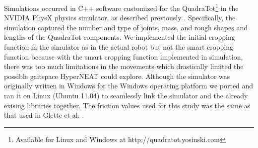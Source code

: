 Simulations occurred in C++ software customized for the QuadraTot\footnote{Available for Linux and Windows at http://quadratot.yosinski.com} in the NVIDIA PhysX physics simulator, as described previously \cite{glette}. 
Specifically, the simulation captured the number and type of joints, mass, and rough shapes and lengths of the QuadraTot components. 
We implemented the initial cropping function in the simulator as in the actual robot but not the smart cropping function because with the smart cropping function implemented in simulation, there was too much limitations in the movements which drastically limited the possible gaitspace HyperNEAT could explore. %
Although the simulator was originally written in Windows for the Windows operating platform we ported and ran it on Linux (Ubuntu 11.04) to seamlessly link the simulator and the already exising libraries together. 
The friction values used for this study was the same as that used in Glette et al. \cite{glette}. 
%
%

